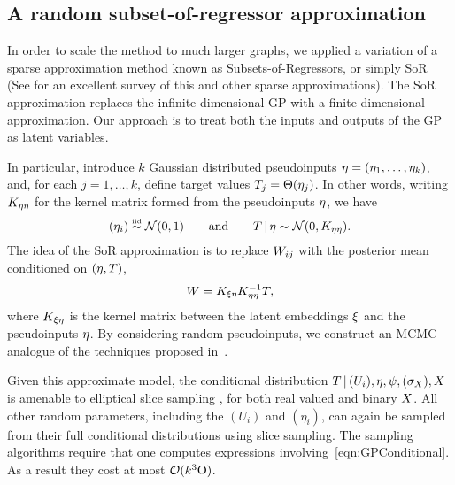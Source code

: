\subsection{A random subset-of-regressor approximation}

In order to scale the method to much larger graphs, we applied a variation of a sparse approximation method known as Subsets-of-Regressors, or simply SoR \citep{Alex_J_Smola2001-ev,Wahba1999-bl,Silverman1985-ys} (See \citet{Quinonero-Candela2005-er} for an excellent survey of this and other sparse approximations).
The SoR approximation replaces the infinite dimensional GP with a finite dimensional approximation.
Our approach is to treat both the inputs and outputs of the GP as latent variables.

In particular, 
introduce $k$ Gaussian distributed pseudoinputs $\eta=(\eta_1,\dotsc,\eta_k)$, and, for each $j=1,\dotsc,k$, define target values ${T_j = \Theta(\eta_j)}$.  In other words, writing $K_{\eta\eta}$ for the kernel matrix formed from the pseudoinputs $\eta$, we have
\[
(\eta_i) \overset{\mbox{\tiny iid}}{\sim} \mathcal{N}(0,1) \qquad\text{and}\qquad
T \,|\, \eta \sim \mathcal{N}(0,K_{\eta\eta}).
\]
The idea of the SoR approximation is to replace $W_{ij}$ with the posterior mean conditioned on $(\eta,T)$,
\[
W = K_{\xi\eta} K_{\eta\eta}^{-1}T,
\label{eqn:GPConditional}
\]
where $K_{\xi\eta}$ is the kernel matrix between the latent embeddings $\xi$ and the pseudoinputs $\eta$.  By considering random pseudoinputs, we construct an MCMC analogue of the techniques proposed in~\cite{Titsias2008-gp}.

Given this approximate model, the conditional distribution $T \,|\, (U_i), \eta, \psi, (\sigma_X), X$ is amenable to elliptical slice sampling \citep{Murray2010-zu}, for both real valued and binary $X$. All other random parameters, including the $(U_i)$ and $(\eta_i)$, can again be sampled from their full conditional distributions using slice sampling.  The sampling algorithms require that one computes expressions involving~\eqref{eqn:GPConditional}. As a result they cost at most $\mathcal{O}(k^3 \mathrm O)$.

